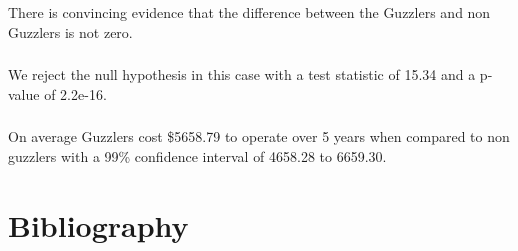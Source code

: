 \documentclass[letterpaper, onecolumn,10pt]{IEEEtran}
\begin{document}
                \subsubsection{}
                There is convincing evidence that the difference between the Guzzlers and non Guzzlers is not zero.\\
                
                \subsubsection{}
		        We reject the null hypothesis in this case with a test statistic of 15.34 and a p-value of 2.2e-16.
		        
		        \subsubsection{}
		        On average Guzzlers cost \$5658.79 to operate over 5 years when compared to non guzzlers with a 99\% confidence interval of 4658.28 to 6659.30.\\ 
		
		\section{Bibliography}
		
		
\end{document}
